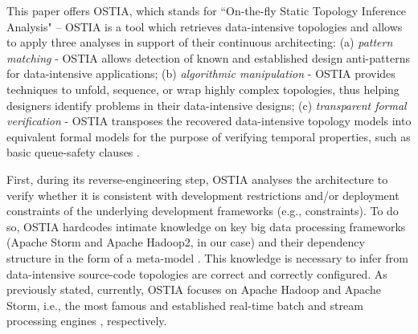 This paper offers OSTIA, which stands for ``On-the-fly Static Topology Inference Analysis" -- OSTIA is a tool which retrieves data-intensive topologies and allows to apply three analyses in support of their continuous architecting: (a) \emph{pattern matching} - OSTIA allows detection of known and established design anti-patterns for data-intensive applications; (b) \emph{algorithmic manipulation} - OSTIA provides techniques to unfold, sequence, or wrap highly complex topologies, thus helping designers identify problems in their data-intensive designs; (c) \emph{transparent formal verification} - OSTIA transposes the recovered data-intensive topology models into equivalent formal models for the purpose of verifying temporal properties, such as basic queue-safety clauses \cite{icsoft}. 

First, during its reverse-engineering step, OSTIA analyses the architecture to verify whether it is consistent with development restrictions and/or deployment constraints of the underlying development frameworks (e.g., constraints). To do so, OSTIA hardcodes intimate knowledge on key big data processing frameworks (Apache Storm and Apache Hadoop2, in our case) and their dependency structure in the form of a meta-model \cite{mda}. This knowledge is necessary to infer from data-intensive source-code topologies are correct and correctly configured. As previously stated, currently, OSTIA focuses on Apache Hadoop and Apache Storm, i.e., the most famous and established real-time batch and stream processing engines \cite{storm, toshniwal2014storm}, respectively. 



